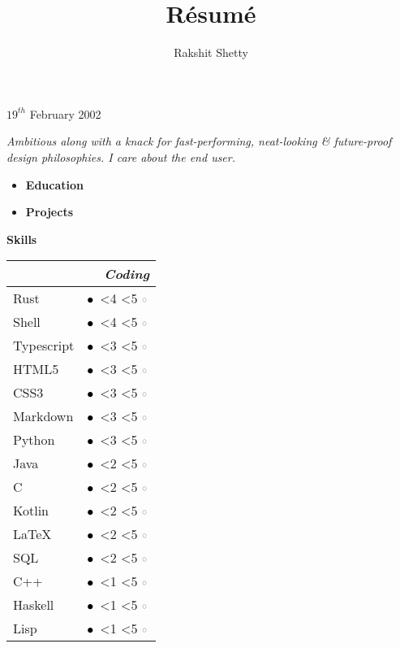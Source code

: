 \documentclass[12pt, a4paper]{article}
\makeatletter
\newcommand{\openbullet}{\ensuremath{\circ}}%
\newcommand{\solidbullet}{\ensuremath{\bullet}}%
\newcounter{counter_skilllevel}%
\newcommand{\level}[1]{%
    \setcounter{counter_skilllevel}{0}%
    \loop%
        \textcolor{black}{\Large\solidbullet}\,%
        \stepcounter{counter_skilllevel}%
        \ifnum \value{counter_skilllevel}<#1%
    \repeat%
    \loop%
        \ifnum \value{counter_skilllevel}<5%
        \stepcounter{counter_skilllevel}%
        \textcolor{darkgray}{\Large\openbullet}\,%
    \repeat%
}
\newcommand{\email}{\color{blue}{rakshit24x7@gmail.com}\color{black}}
\newcommand{\dob}{$19^{th}$ February 2002}
\newcommand{\linkedin}{\color{blue}\url{https://www.linkedin.com/in/rakshit-shetty-465777242}\color{black}}
\newcommand{\github}{\color{blue}\url{https://github.com/decent-man}\color{black}}
\newcommand{\about}{Ambitious along with a knack for fast-performing, neat-looking \& future-proof design philosophies. I care about the end user.}
\renewcommand{\maketitle} {
	\raggedright
		{\huge\bfseries\theauthor} \linebreak[4]
		\vspace{.25em}
		\email \linebreak[4]
		\vspace{.25em}
		\dob \linebreak[4]
		\vspace{.25em}
		\parbox{17em}{
			\textsl{\about} \linebreak[4]
		}
		\vspace{.45em}
}
\makeatother
\begin{document}
	\title{R\'esum\'e}
	\author{Rakshit Shetty}

	\maketitle

	\begin{multicols}{2}
		\begin{minipage}{0.25\linewidth}
			\begin{itemize}
				\item[] {\large\bfseries Education}
				\item[] {\large\bfseries Projects}
			\end{itemize}
		\end{minipage}
	\columnbreak
				\newline
				{\large\bfseries Skills}
				{\setlength\columnseprule{0pt}
				\begin{multicols}{2}
					\begin{table}[H]
						\label{tab:}
							\begin{tabular}[c]{ll}
								\multicolumn{2}{r}{\slshape\bfseries Coding}\\
								\toprule
								Rust & \level{4} \\
								Shell & \level{4} \\
								{\footnotesize Typescript} & \level{3} \\
								HTML5 & \level{3} \\
								CSS3 & \level{3} \\
								{\footnotesize Markdown} & \level{3} \\
								Python & \level{3} \\
								Java & \level{2} \\
								C & \level{2} \\
								Kotlin & \level{2} \\
								{\LaTeX} & \level{2} \\
								SQL & \level{2} \\
								C++ & \level{1} \\
								Haskell & \level{1} \\
								Lisp & \level{1} \\
							\end{tabular}
					\end{table}
				\columnbreak
					\begin{table}[H]
						\label{tab:}
						\raggedleft
							\begin{tabular}[c]{ll}

\end{tabular}
\end{table}
\end{multicols}}
\end{multicols}
\end{document}
